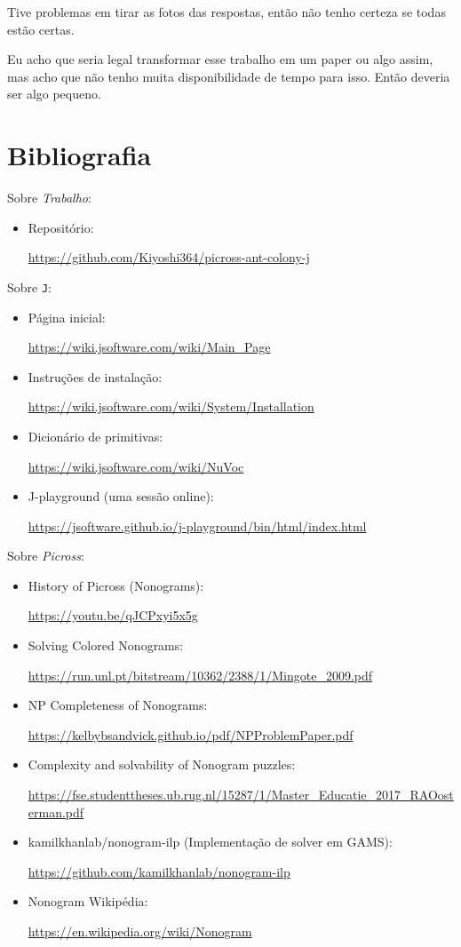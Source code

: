 \documentclass{article}
\newcommand{\lang}{\texttt{J}}
\begin{document}
Tive problemas em tirar as fotos das respostas,
então não tenho certeza se todas estão certas.

Eu acho que seria legal transformar esse trabalho
em um paper ou algo assim,
mas acho que não tenho muita disponibilidade de tempo para isso.
Então deveria ser algo pequeno.

\section{Bibliografia} \label{s:bib}

Sobre \emph{Trabalho}:
\begin{itemize}
    \item Repositório: \par
    \url{https://github.com/Kiyoshi364/picross-ant-colony-j}
\end{itemize}

\noindent
Sobre \lang{}:
\begin{itemize}
    \item Página inicial: \par
        \url{https://wiki.jsoftware.com/wiki/Main_Page}
    \item Instruções de instalação: \par
        \url{https://wiki.jsoftware.com/wiki/System/Installation}
    \item Dicionário de primitivas: \par
        \url{https://wiki.jsoftware.com/wiki/NuVoc}
    \item J-playground (uma sessão online): \par
        \url{https://jsoftware.github.io/j-playground/bin/html/index.html}
\end{itemize}

\noindent
Sobre \emph{Picross}:
\begin{itemize}
    \item History of Picross (Nonograms): \par
        \url{https://youtu.be/qJCPxyi5x5g}
    \item Solving Colored Nonograms: \par
        \url{https://run.unl.pt/bitstream/10362/2388/1/Mingote_2009.pdf}
    \item NP Completeness of Nonograms: \par
        \url{https://kelbybsandvick.github.io/pdf/NPProblemPaper.pdf}
    \item Complexity and solvability of Nonogram puzzles: \par
        \url{https://fse.studenttheses.ub.rug.nl/15287/1/Master_Educatie_2017_RAOosterman.pdf}
    \item kamilkhanlab/nonogram-ilp
        (Implementação de solver em GAMS): \par
        \url{https://github.com/kamilkhanlab/nonogram-ilp}
    \item Nonogram Wikipédia: \par
        \url{https://en.wikipedia.org/wiki/Nonogram}
\end{itemize}
\end{document}
